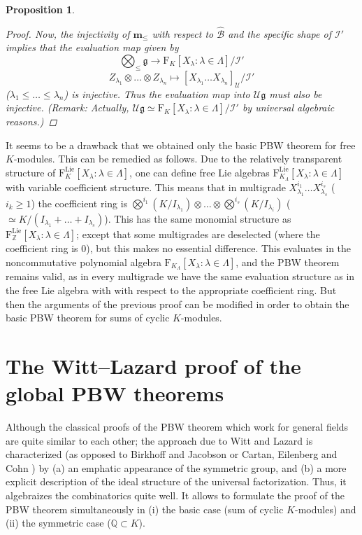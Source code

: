 \documentclass[11pt,a4paper]{amsart}
\newcommand{\plabel}[1]{ \label{#1}}
\newcommand{\snewpage}{}
\newcommand{\plabel}[1]{ \label{#1}\rlap{\smash{${}^{^{[#1]}}$}}}
\newcommand{\snewpage}{\newpage}
\newcommand{\plabel}[1]{ \label{#1}}
\newcommand{\snewpage}{}
\DeclareMathOperator{\Lie}{Lie}
\newcommand{\bo}{\boldsymbol}
\newcommand{\botimes}{{\textstyle\bigotimes}}
\theoremstyle{definition}
\theoremstyle{plain}
\newtheorem{prop}[point]{Proposition}
\begin{document}
\begin{prop}
\begin{proof}
Now, the injectivity of $\bo m_\leq$ with respect to $\hat{\mathcal B}$ and
the specific shape of $\mathcal I'$ implies
 that the evaluation map given by
\[\textstyle{\bigotimes_\leq}\mathfrak g\rightarrow\mathrm  F_K[X_\lambda:\lambda\in\Lambda]/\mathcal I'\]
\[Z_{\lambda_1}\otimes\ldots\otimes Z_{\lambda_n}\mapsto  [X_{\lambda_1}\ldots X_{\lambda_n}]_{\mathcal U}/\mathcal I'\]
 ($\lambda_1\leq\ldots\leq\lambda_n$) is injective.
Thus the evaluation map into $\mathcal U\mathfrak g$ must also be injective.
(Remark: Actually, $\mathcal U\mathfrak g\simeq\mathrm   F_K[X_\lambda:\lambda\in\Lambda]/\mathcal I'$
 by universal algebraic reasons.)
\end{proof}
\end{prop}
\snewpage

It seems to be a drawback that we obtained only the basic PBW theorem for free $K$-modules.
This can be remedied as follows. Due to the relatively transparent structure of $\mathrm F^{\Lie}_K[X_\lambda:\lambda\in\Lambda]$,
 one can  define free Lie algebras $\mathrm F^{\Lie}_{K_\Lambda}[X_\lambda:\lambda\in\Lambda]$ with variable coefficient structure.
This means that in multigrade $X_{\lambda_1}^{i_1}\ldots X_{\lambda_s}^{i_s}$ ($i_k\geq1$)
 the coefficient ring is $\botimes^{i_1}(K/I_{\lambda_1})\otimes\ldots\otimes \botimes^{i_s}(K/I_{\lambda_i})$
 ($\simeq K/(I_{\lambda_1}+\ldots +I_{\lambda_s})$).
This has the same monomial structure as $\mathrm F^{\Lie}_{\mathbb Z}[X_\lambda:\lambda\in\Lambda]$; except that
 some multigrades are deselected (where the coefficient ring is $0$), but this makes no essential difference.
This evaluates in the noncommutative polynomial algebra $\mathrm F_{K_\Lambda}[X_\lambda:\lambda\in\Lambda]$, and the
 PBW theorem remains valid, as in every multigrade we have the same evaluation structure as in the free Lie algebra
 with with respect to the appropriate coefficient ring.
But then the arguments of the previous proof can be modified in order to obtain the  basic PBW theorem for sums of cyclic $K$-modules.


\snewpage

\appendix
\section{The Witt--Lazard proof of the global PBW theorems}\plabel{sec:lazard}

Although the classical proofs of the PBW theorem which work for general fields
are quite similar to each other; the approach due to  Witt \cite{W} and
Lazard \cite{L} is characterized (as opposed to Birkhoff \cite{B} and Jacobson \cite{J} or
Cartan, Eilenberg \cite{CE} and Cohn \cite{CC})
by (a) an emphatic appearance of the symmetric group, and (b) a more explicit
description of the ideal structure of the universal factorization.
Thus, it algebraizes the combinatorics quite well.
It allows to formulate the proof of the PBW theorem simultaneously
in (i)  the basic case (sum of cyclic $K$-modules) and (ii) the symmetric case ($\mathbb Q\subset K$).
\end{document}
